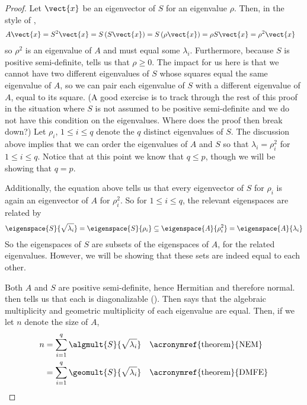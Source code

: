 %
\begin{proof}
Let $\vect{x}$ be an eigenvector of $S$ for an eigenvalue $\rho$.  Then, in the style of ,
%
\begin{align*}
A\vect{x}&=S^2\vect{x}=S\left(S\vect{x}\right)
=S\left(\rho\vect{x}\right)=\rho S\vect{x}=\rho^2\vect{x}
\end{align*}
%
so $\rho^2$ is an eigenvalue of $A$ and must equal some $\lambda_i$.  Furthermore, because $S$ is positive semi-definite,  tells us that $\rho\geq 0$.  The impact for us here is that we cannot have two different eigenvalues of $S$ whose squares equal the same eigenvalue of $A$, so we can pair each eigenvalue of $S$ with a different eigenvalue of $A$, equal to its square.  (A good exercise is to track through the rest of this proof in the situation where $S$ is not assumed to be positive semi-definite and we do not have this condition on the eigenvalues.  Where does the proof then break down?) Let $\rho_i$, $1\leq i\leq q$ denote the $q$ distinct eigenvalues of $S$.  The discussion above implies that we can order the eigenvalues of $A$ and $S$ so that $\lambda_i=\rho_i^2$ for $1\leq i\leq q$.  Notice that at this point we know that $q\leq p$, though we will be showing that $q=p$.\par
%
Additionally, the equation above tells us that every eigenvector of $S$ for $\rho_i$ is again an eigenvector of $A$ for $\rho_i^2$.  So for $1\leq i\leq q$, the relevant eigenspaces are related by
%
\begin{align*}
\eigenspace{S}{\sqrt{\lambda_i}}=\eigenspace{S}{\rho_i}
\subseteq
\eigenspace{A}{\rho_i^2}=\eigenspace{A}{\lambda_i}
\end{align*}
%
So the eigenspaces of $S$ are subsets of the eigenspaces of $A$, for the related eigenvalues.  However, we will be showing that these sets are indeed equal to each other.\par
%
Both $A$ and $S$ are positive semi-definite, hence Hermitian and therefore normal.   then tells us that each is diagonalizable ().  Then  says that the algebraic multiplicity and geometric multiplicity of each eigenvalue are equal.  Then, if we let $n$ denote the size of $A$,
%
\begin{align*}
n
&=\sum_{i=1}^{q}\algmult{S}{\sqrt{\lambda_i}}&&\text{\acronymref{theorem}{NEM}}\\
&=\sum_{i=1}^{q}\geomult{S}{\sqrt{\lambda_i}}&&\text{\acronymref{theorem}{DMFE}}\\

\end{align*}
\end{proof}
